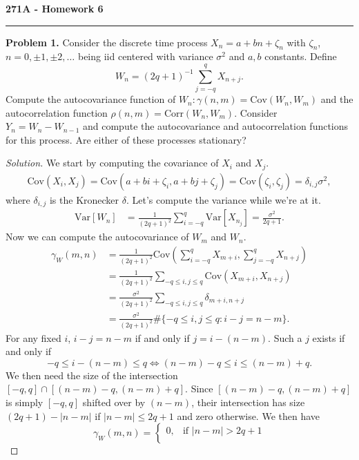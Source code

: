 \documentclass[11pt,letterpaper]{report}
\newcommand{\Var}{\text{Var}}
\newcommand{\Cov}{\text{Cov}}
\newcommand{\Corr}{\text{Corr}}
\newenvironment{solution}
{\begin{proof}[Solution]}
{\end{proof}}
\begin{document}
\begin{center}
{\bf \Large 271A - Homework 6}
\vspace{0.2cm}
\hrule
\end{center}

\noindent\textbf{Problem 1. }
Consider the discrete time process $X_n = a+bn+\zeta_n$ with $\zeta_n$, $n = 0, \pm 1, \pm 2, \ldots$ being iid centered with variance $\sigma^2$ and $a,b$ constants. Define
\[
W_n = (2q+1)^{-1}\sum_{j=-q}^qX_{n+j}.
\]
Compute the autocovariance function of $W_n: \gamma(n,m) = \Cov(W_n, W_m)$ and the autocorrelation function $\rho(n,m) = \Corr(W_n, W_m)$. Consider $Y_n = W_n - W_{n-1}$ and compute the autocovariance and autocorrelation functions for this process. Are either of these processes stationary?
\begin{solution}
	We start by computing the covariance of $X_i$ and $X_j$.
	\begin{align*}
		\Cov(X_i, X_j) = \Cov(a+bi+\zeta_i, a+bj+\zeta_j) = \Cov(\zeta_i, \zeta_j) = \delta_{i,j}\sigma^2,
	\end{align*}
	where $\delta_{i,j}$ is the Kronecker $\delta$. Let's compute the variance while we're at it.
	\begin{align*}
		\Var[W_n] &= \frac{1}{(2q+1)^2}\sum_{i=-q}^q\Var[X_{n_j}] = \frac{\sigma^2}{2q+1}.
	\end{align*}
	Now we can compute the autocovariance of $W_m$ and $W_n$.
	\begin{align*}
		\gamma_W(m, n) &= \frac{1}{(2q+1)^2}\Cov\left(\sum_{i = -q}^qX_{m+i}, \sum_{j=-q}^qX_{n+j}\right)\\
		&= \frac{1}{(2q+1)^2}\sum_{-q\leq i,j\leq q}\Cov(X_{m+i}, X_{n+j})\\
		&= \frac{\sigma^2}{(2q+1)^2}\sum_{-q\leq i,j\leq q}\delta_{m+i, n+j}\\
		&= \frac{\sigma^2}{(2q+1)^2}\#\{-q\leq i,j\leq q: i-j = n-m\}.
	\end{align*}
	For any fixed $i$, $i-j = n-m$ if and only if $j = i - (n-m)$. Such a $j$ exists if and only if
	\[
	-q \leq i-(n-m)\leq q \iff (n-m)-q \leq i \leq (n-m)+q.
	\]
	We then need the size of the intersection $[-q, q] \cap [(n-m)-q, (n-m)+q]$. Since $[(n-m)-q, (n-m)+q]$ is simply $[-q, q]$ shifted over by $(n-m)$, their intersection has size $(2q+1) - |n-m|$ if $|n-m|\leq 2q+1$ and zero otherwise. We then have
	\[
	\gamma_W(m,n) = \begin{cases}
		0,&\text{if }|n-m|> 2q+1\\

\end{cases}\]
\end{solution}
\end{document}
